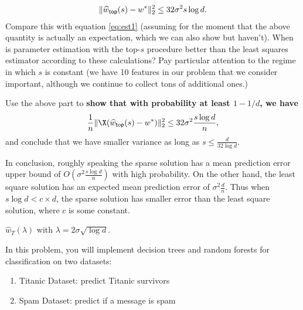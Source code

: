 \documentclass[preview]{standalone}
\begin{document}
\begin{Parts}
\begin{align*}
\| \widehat{w}_{{\sf top}}(s) - w^* \|_2^2 \leq 32 \sigma^2 s\log d.
\end{align*}
Compare this with equation \eqref{eq:est1} (assuming for the moment that the above quantity is actually an expectation, which we can also show but haven't). When is parameter estimation with the top-$s$ procedure better than the least squares estimator according to these calculations? Pay particular attention to the regime in which $s$ is constant (we have 10 features in our problem that we consider important, although we continue to collect tons of additional ones.) 



\Part Use the above part to {\bf show that with probability at least $1 - 1/d$, we have}
\begin{align*}
\frac{1}{n} \| \X (\widehat{w}_{{\sf top}}(s) - w^*) \|_2^2 \leq 32 \sigma^2 \frac{s \log d}{n},
\end{align*}
and conclude that we have smaller variance as long as $s \leq \frac{d}{32 \log d}$.



In conclusion, roughly speaking the sparse solution has a mean prediction error upper bound of $O(\sigma^2 \frac{s \log d}{n})$ with high probability. On the other hand, the least square solution has an expected mean prediction error of $\sigma^2 \frac{d}{n}$. Thus when $s \log d < c \times d$, the sparse solution has smaller error than the least square solution, where $c$ is some constant.




 $\widehat{w}_{T}(\lambda)$ with $\lambda = 2 \sigma \sqrt{\log d}$.



\end{Parts}

In this problem, you will implement decision trees and random forests for classification on two datasets:
\begin{enumerate}
	\item Titanic Dataset: predict Titanic survivors
	\item Spam Dataset: predict if a message is spam
\end{enumerate}
\end{document}
